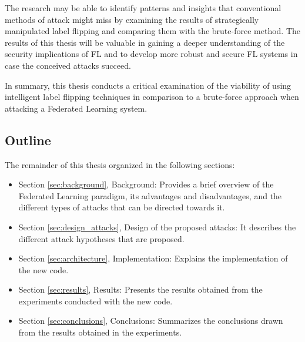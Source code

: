 The research may be able to identify patterns and insights that conventional methods of attack might miss by examining the results of strategically manipulated label flipping and comparing them with the brute-force method.
The results of this thesis will be valuable in gaining a deeper understanding of the security implications of FL and to develop more robust and secure FL systems in case the conceived attacks succeed.


In summary, this thesis conducts a critical examination of the viability of using intelligent label flipping techniques in comparison to a brute-force approach when attacking a Federated Learning system.

\subsection{Outline}
The remainder of this thesis organized in the following sections:
\begin{itemize}
    \item Section \ref{sec:background}, Background: Provides a brief overview of the Federated Learning paradigm, its advantages and disadvantages, and the different types of attacks that can be directed towards it.
    \item Section \ref{sec:design_attacks}, Design of the proposed attacks: It describes the different attack hypotheses that are proposed.
    \item Section \ref{sec:architecture}, Implementation: Explains the implementation of the new code.
    \item Section \ref{sec:results}, Results: Presents the results obtained from the experiments conducted with the new code.
    \item Section \ref{sec:conclusions}, Conclusions: Summarizes the conclusions drawn from the results obtained in the experiments.
\end{itemize}

\pagebreak